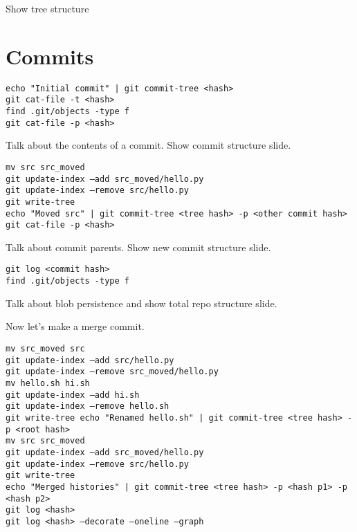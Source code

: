 \documentclass[a4paper,12pt]{article}
\begin{document}
\vspace{0.1in}

Show tree structure

\section*{Commits}

\texttt{echo "Initial commit" | git commit-tree <hash>\\
git cat-file -t <hash>\\
find .git/objects -type f\\
git cat-file -p <hash>}

\vspace{0.1in}

Talk about the contents of a commit. Show commit structure slide.

\vspace{0.1in}

\texttt{mv src src\_moved\\
git update-index --add src\_moved/hello.py\\
git update-index --remove src/hello.py\\
git write-tree\\
echo "Moved src" | git commit-tree <tree hash> -p <other commit hash>\\
git cat-file -p <hash>}

\vspace{0.1in}

Talk about commit parents. Show new commit structure slide.

\vspace{0.1in}

\texttt{git log <commit hash>\\
find .git/objects -type f}

\vspace{0.1in}

Talk about blob persistence and show total repo structure slide.

Now let's make a merge commit.

\vspace{0.1in}

\texttt{mv src\_moved src\\
git update-index --add src/hello.py\\
git update-index --remove src\_moved/hello.py\\
mv hello.sh hi.sh\\
git update-index --add hi.sh\\
git update-index --remove hello.sh\\
git write-tree
echo "Renamed hello.sh" | git commit-tree <tree hash> -p <root hash>\\
mv src src\_moved\\
git update-index --add src\_moved/hello.py\\
git update-index --remove src/hello.py\\
git write-tree\\
echo "Merged histories" | git commit-tree <tree hash> -p <hash p1> -p <hash p2>\\
git log <hash>\\
git log <hash> --decorate --oneline --graph}
\end{document}

